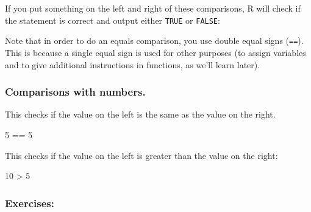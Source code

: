 \documentclass[
  letterpaper,
  DIV=11,
  numbers=noendperiod]{scrreprt}
\newenvironment{Shaded}{\begin{snugshade}}{\end{snugshade}}
\newcommand{\NormalTok}[1]{\textcolor[rgb]{0.00,0.23,0.31}{#1}}
\begin{document}
If you put something on the left and right of these comparisons, R will
check if the statement is correct and output either \texttt{TRUE} or
\texttt{FALSE}:

\begin{tcolorbox}[enhanced jigsaw, coltitle=black, bottomrule=.15mm, title=\textcolor{quarto-callout-warning-color}{\faExclamationTriangle}\hspace{0.5em}{Warning}, leftrule=.75mm, colframe=quarto-callout-warning-color-frame, breakable, toprule=.15mm, opacityback=0, bottomtitle=1mm, toptitle=1mm, colback=white, rightrule=.15mm, titlerule=0mm, left=2mm, arc=.35mm, opacitybacktitle=0.6, colbacktitle=quarto-callout-warning-color!10!white]

Note that in order to do an equals comparison, you use double equal
signs (\texttt{==}). This is because a single equal sign is used for
other purposes (to assign variables and to give additional instructions
in functions, as we'll learn later).

\end{tcolorbox}

\subsubsection{Comparisons with
numbers.}\label{comparisons-with-numbers.}

This checks if the value on the left is the same as the value on the
right.

\begin{Shaded}
\begin{Highlighting}[]

\NormalTok{5 == 5}

\end{Highlighting}
\end{Shaded}

This checks if the value on the left is greater than the value on the
right:

\begin{Shaded}
\begin{Highlighting}[]

\NormalTok{10 \textgreater{} 5}
\end{Highlighting}
\end{Shaded}

\subsubsection{Exercises:}\label{exercises-2}
\end{document}
